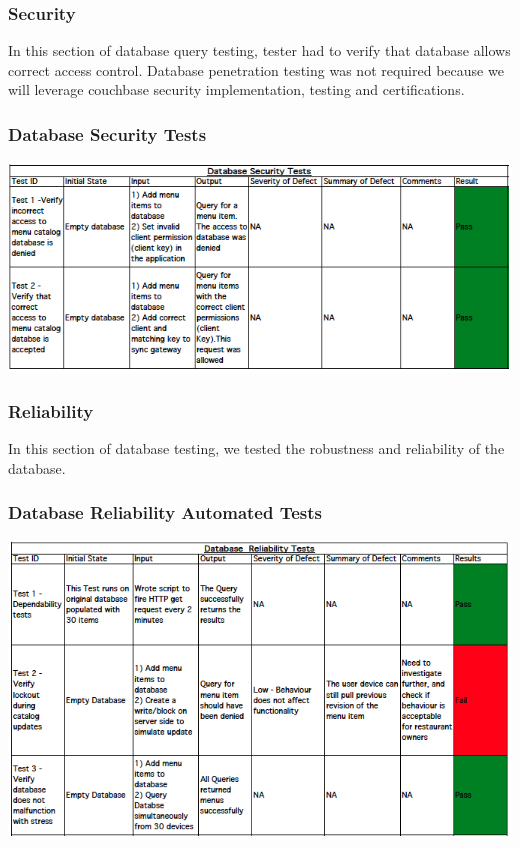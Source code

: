 \documentclass[12pt, titlepage]{article}
\begin{document}
\subsubsection{Security}
In this section of database query testing, tester had to verify that database allows correct access control. Database penetration testing was not required because we will leverage couchbase security implementation, testing and certifications.
\subsubsection{Database Security Tests }
\includegraphics[width=\textwidth,height=\textheight,keepaspectratio]{security_tests.png}

\subsubsection{Reliability}
In this section of database testing, we tested the robustness and reliability of the database. 
\subsubsection{Database Reliability Automated Tests }
\includegraphics[width=\textwidth,height=\textheight,keepaspectratio]{reliability_tests.png}
\end{document}
